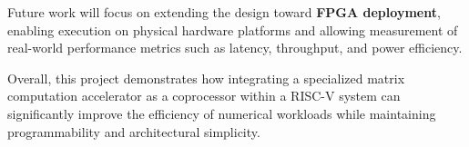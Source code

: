﻿\documentclass[12pt,a4paper]{report}
\begin{document}
Future work will focus on extending the design toward \textbf{FPGA deployment}, enabling execution on physical hardware platforms and allowing measurement of real-world performance metrics such as latency, throughput, and power efficiency.

Overall, this project demonstrates how integrating a specialized matrix computation accelerator as a coprocessor within a RISC-V system can significantly improve the efficiency of numerical workloads while maintaining programmability and architectural simplicity.

%
%
%    
%    

%
%
%    
%    
\end{document}
